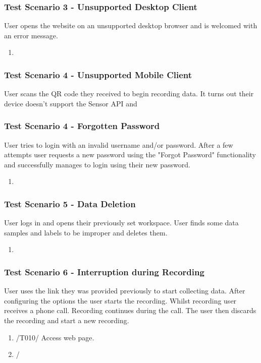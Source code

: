 \subsubsection{Test Scenario 3 - Unsupported Desktop Client}
User opens the website on an unsupported desktop browser and is welcomed with an error message.
\begin{enumerate}
    \item 
\end{enumerate} 
\subsubsection{Test Scenario 4 - Unsupported Mobile Client}
User scans the QR code they received to begin recording data. It turns out their device doesn't support the Sensor API and  
\subsubsection{Test Scenario 4 - Forgotten Password}
User tries to login with an invalid username and/or password. After a few attempts user requests a new password using the "Forgot Password" functionality and successfully manages to login using their new password.
\begin{enumerate}
    \item 
\end{enumerate} 
\subsubsection{Test Scenario 5 - Data Deletion} 
User logs in and opens their previously set workspace. User finds some data samples and labels to be improper and deletes them.
\begin{enumerate}
    \item 
\end{enumerate}
\subsubsection{Test Scenario 6 - Interruption during Recording}
User uses the link they was provided previously to start collecting data. After configuring the options the user starts the recording. Whilst recording user receives a phone call. Recording continues during the call. The user then discards the recording and start a new recording. 
\begin{enumerate}
    \item /T010/ Access web page.
    \item /
\end{enumerate}
